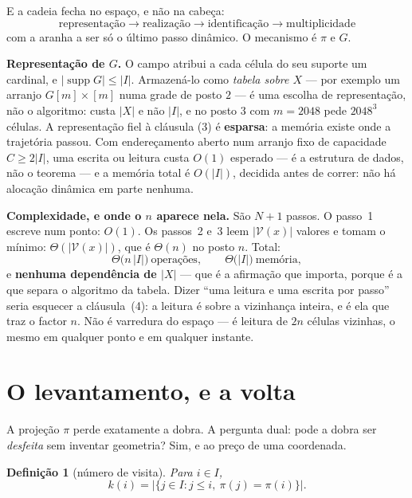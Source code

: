 \documentclass[11pt,a4paper]{article}
\newcommand{\abs}[1]{\lvert #1\rvert}
\newtheorem{definicao}[teorema]{Definição}
\begin{document}
\medskip\noindent E a cadeia fecha no espaço, e não na cabeça:
\[
\boxed{\ \text{representação}\longrightarrow\text{realização}
\longrightarrow\text{identificação}\longrightarrow\text{multiplicidade}\ }
\]
com a aranha a ser só o último passo dinâmico. O mecanismo é $\pi$ e $G$.

\medskip\noindent\textbf{Representação de $G$.} O campo atribui a cada célula do
seu suporte um cardinal, e $\lvert\operatorname{supp}G\rvert\le\abs{I}$.
Armazená-lo como \emph{tabela sobre $X$} --- por exemplo um arranjo
$G[m]\times[m]$ numa grade de posto $2$ --- é uma escolha de representação, não o
algoritmo: custa $\lvert X\rvert$ e não $\abs{I}$, e no posto $3$ com $m=2048$ pede
$2048^3$ células. A representação fiel à cláusula (3) é \textbf{esparsa}: a
memória existe onde a trajetória passou. Com endereçamento aberto num arranjo
fixo de capacidade $C\ge2\abs{I}$, uma escrita ou leitura custa $O(1)$ esperado
--- é a estrutura de dados, não o teorema --- e a memória total é $O(\abs{I})$,
decidida antes de correr: não há alocação dinâmica em parte nenhuma.

\medskip\noindent\textbf{Complexidade, e onde o $n$ aparece nela.} São $N+1$
passos. O passo~1 escreve num ponto: $O(1)$. Os passos~2 e~3 leem
$\lvert \mathcal{V}(x)\rvert$ valores e tomam o mínimo: $\Theta(\lvert \mathcal{V}(x)\rvert)$, que
é $\Theta(n)$ no posto $n$. Total:
\[
\Theta\bigl(n\,\abs{I}\bigr)\ \text{operações},\qquad
\Theta\bigl(\abs{I}\bigr)\ \text{memória},
\]
e \textbf{nenhuma dependência de $\lvert X\rvert$} --- que é a afirmação que
importa, porque é a que separa o algoritmo da tabela. Dizer ``uma leitura e uma
escrita por passo'' seria esquecer a cláusula~(4): a leitura é sobre a
vizinhança inteira, e é ela que traz o factor $n$. Não é varredura do espaço ---
é leitura de $2n$ células vizinhas, o mesmo em qualquer ponto e em qualquer
instante.

\section{O levantamento, e a volta}\label{sec:inversa}

\noindent A projeção $\pi$ perde exatamente a dobra. A pergunta dual: pode a
dobra ser \emph{desfeita} sem inventar geometria? Sim, e ao preço de uma
coordenada.

\begin{definicao}[número de visita]\label{def:k}
Para $i\in I$,
\[
k(i)=\bigl\lvert\{j\in I: j\le i,\ \pi(j)=\pi(i)\}\bigr\rvert .
\]
\end{definicao}
\end{document}
